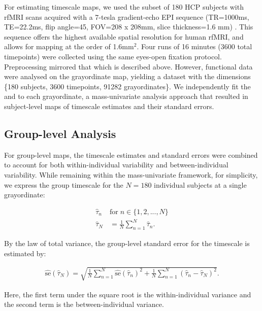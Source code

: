 \documentclass[main.tex]{subfiles}
\begin{document}
For estimating timescale maps, we used the subset of 180 HCP subjects with rfMRI scans acquired with a 7-tesla gradient-echo EPI sequence (TR=1000ms, TE=22.2ms, flip angle=45\textdegree, FOV=208 x 208mm, slice thickness=1.6 mm) \citep{van_essen_wu-minn_2013, moeller_multiband_2010}. This sequence offers the highest available spatial resolution for human rfMRI, and allows for mapping at the order of 1.6mm$^2$. Four runs of 16 minutes (3600 total timepoints) were collected using the same eyes-open fixation protocol. Preprocessing mirrored that which is described above. However, functional data were analysed on the grayordinate map, yielding a dataset with the dimensions \{180 subjects, 3600 timepoints, 91282 grayordinates\}. We independently fit the  and  to each grayordinate, a mass-univariate analysis approach that resulted in subject-level maps of timescale estimates and their standard errors.\\

\subsection{Group-level Analysis}\label{sec:group-level-analysis}
For group-level maps, the timescale estimates and standard errors were combined to account for both within-individual variability and between-individual variability. While remaining within the mass-univariate framework, for simplicity, we express the group timescale for the $N=180$ individual subjects at a single grayordinate:

\begin{align}
    \hat\tau_n \; &\text{for} \; n\in\{1, 2, ..., N\}\\
    \hat\tau_N &= \frac{1}{N} \sum_{n=1}^N \hat\tau_n.
\end{align}

\noindent By the law of total variance, the group-level standard error for the timescale is estimated by:

\begin{align}
    \widehat{\text{se}}(\hat\tau_N) = \sqrt{\frac{1}{N} \sum_{n=1}^N \widehat{\text{se}}(\hat\tau_n)^2 + \frac{1}{N} \sum_{n=1}^N (\hat\tau_n - \hat\tau_N)^2}.
\end{align}

\noindent Here, the first term under the square root is the within-individual variance and the second term is the between-individual variance.\\
\end{document}

